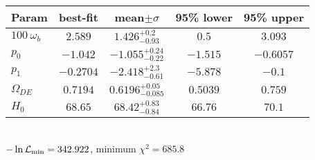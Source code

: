 \begin{tabular}{|l|c|c|c|c|} 
 \hline 
Param & best-fit & mean$\pm\sigma$ & 95\% lower & 95\% upper \\ \hline 
$100~\omega_{b }$ &$2.589$ & $1.426_{-0.93}^{+0.2}$ & $0.5$ & $3.093$ \\ 
$p_{0 }$ &$-1.042$ & $-1.055_{-0.22}^{+0.24}$ & $-1.515$ & $-0.6057$ \\ 
$p_{1 }$ &$-0.2704$ & $-2.418_{-0.61}^{+2.3}$ & $-5.878$ & $-0.1$ \\ 
$\Omega_{DE}$ &$0.7194$ & $0.6196_{-0.085}^{+0.05}$ & $0.5039$ & $0.759$ \\ 
$H_{0 }$ &$68.65$ & $68.42_{-0.84}^{+0.83}$ & $66.76$ & $70.1$ \\ 
\hline 
 \end{tabular} \\ 
$-\ln{\cal L}_\mathrm{min} =342.922$, minimum $\chi^2=685.8$ \\ 
